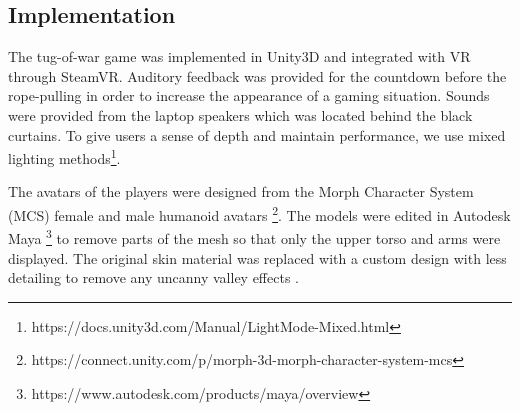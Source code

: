 \subsection{Implementation}
\label{section:implementation}
The tug-of-war game was implemented in Unity3D and integrated with VR through SteamVR. Auditory feedback was provided for the countdown before the rope-pulling in order to increase the appearance of a gaming situation. Sounds were provided from the laptop speakers which was located behind the black curtains. 
To give users a sense of depth and maintain performance, we use mixed lighting methods\footnote{https://docs.unity3d.com/Manual/LightMode-Mixed.html}.

The avatars of the players were designed from the Morph Character System (MCS) female and male humanoid avatars  \footnote{https://connect.unity.com/p/morph-3d-morph-character-system-mcs}. The models were edited in Autodesk Maya \footnote{https://www.autodesk.com/products/maya/overview} to remove parts of the mesh so that only the upper torso and arms were displayed. The original skin material was replaced with a custom design with less detailing to remove any uncanny valley effects \cite{geller2008overcoming}. 

